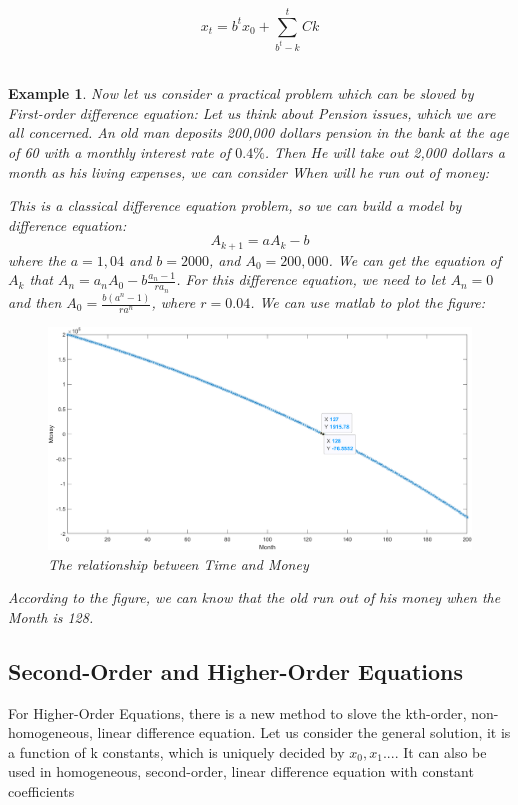\documentclass[12pt]{article}
\newtheorem{example}{Example}[section]
\begin{document}
\begin{equation*}
    x_t = b^t x_0 + \sum^t_{b^t-k} Ck\tag{1.3.9}
\end{equation*}
\\
\begin{example}
Now let us consider a practical problem which can be sloved by First-order difference equation:
Let us think about Pension issues, which we are all concerned. An old man deposits 200,000 dollars pension in the bank at the age of 60 with a monthly interest rate of $0.4\%$. Then He will take out 2,000 dollars a month as his living expenses, we can consider When will he run out of money:

This is a classical difference equation problem, so we can build a model by difference equation:
\begin{equation}
    A_{k+1} = aA_k - b\tag{1.3.10}
\end{equation}
where the $a = 1,04$ and $b = 2000$, and $A_0 = 200,000$. We can get the equation of $A_k$ that $A_n = a_nA_0 - b\frac{a_n - 1}{ra_n}$. For this difference equation, we need to let $A_n = 0$ and then $A_0 = \frac{b(a^n - 1)}{ra^n}$, where $r = 0.04$. We can use matlab to plot the figure:
\begin{figure}[htbp]
    \centering
    \includegraphics[scale=0.4]{difference_equation.png}
    \caption{The relationship between Time and Money}
    \label{fig:my_label}
\end{figure}
According to the figure, we can know that the old run out of his money when the Month is 128.
\end{example}

\subsection{Second-Order and Higher-Order Equations}
For Higher-Order Equations, there is a new method to slove the kth-order, non-homogeneous, linear difference equation. Let us consider the general solution, it is a function of k constants, which is uniquely decided by $x_0, x_1...$. It can also be used in homogeneous, second-order, linear difference equation with constant coefficients\\\\
\end{document}
